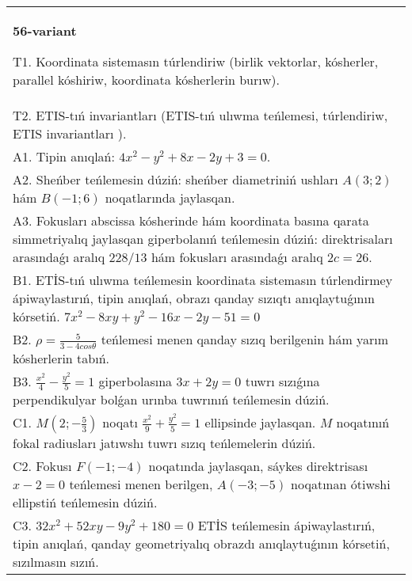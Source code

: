 \documentclass{article}
\begin{document}
\begin{tabular}{m{17cm}}
\textbf{56-variant}
\newline

T1. Koordinata sistemasın túrlendiriw (birlik vektorlar, kósherler, parallel kóshiriw, koordinata kósherlerin burıw).\\

T2. ETIS-tıń invariantları (ETIS-tıń ulıwma teńlemesi, túrlendiriw, ETIS invariantları ).\\

A1. Tipin anıqlań: $4 x^{2}-y^{2}+8 x-2 y+3=0$.\\

A2. Sheńber teńlemesin dúziń: sheńber diametriniń ushları $A (3;2) $ hám $B (-1;6 ) $ noqatlarında jaylasqan.\\

A3. Fokusları abscissa kósherinde hám koordinata basına qarata simmetriyalıq jaylasqan giperbolanıń teńlemesin dúziń: direktrisaları arasındaǵı aralıq $228/13$ hám fokusları arasındaǵı aralıq $2 c=26$.\\

B1. ETİS-tıń ulıwma teńlemesin koordinata sistemasın túrlendirmey ápiwaylastırıń, tipin anıqlań, obrazı qanday sızıqtı anıqlaytuǵının kórsetiń. $7x^{2} - 8xy + y^{2} - 16x - 2y - 51 = 0$  \\

B2. $\rho = \frac{5}{3 - 4cos\theta}$ teńlemesi menen qanday sızıq berilgenin hám yarım kósherlerin tabıń.  \\

B3. $\frac{x^{2}}{4} - \frac{y^{2}}{5} = 1$ giperbolasına $3x + 2y = 0$ tuwrı sızıǵına perpendikulyar bolǵan urınba tuwrınıń teńlemesin dúziń.\\

C1. $M(2; - \frac{5}{3})$ noqatı $\frac{x^{2}}{9} + \frac{y^{2}}{5} = 1$ ellipsinde jaylasqan. $M$ noqatınıń fokal radiusları jatıwshı tuwrı sızıq teńlemelerin dúziń.  \\

C2. Fokusı $F( - 1; - 4)$ noqatında jaylasqan, sáykes direktrisası $x - 2 = 0$ teńlemesi menen berilgen, $A( - 3; - 5)$ noqatınan ótiwshi ellipstiń teńlemesin dúziń.  \\

C3. $32x^{2} + 52xy - 9y^{2} + 180 = 0$ ETİS teńlemesin ápiwaylastırıń, tipin anıqlań, qanday geometriyalıq obrazdı anıqlaytuǵının kórsetiń, sızılmasın sızıń.  \\

\end{tabular}
\vspace{1cm}
\end{document}
